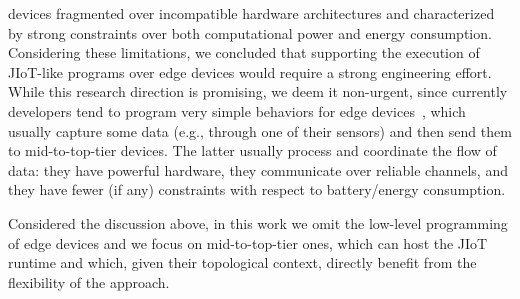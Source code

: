 devices fragmented over incompatible hardware architectures and characterized by
strong constraints over both computational power and energy consumption.
Considering these limitations, we concluded that supporting the execution of
JIoT-like programs over edge devices would require a strong engineering effort.
While this research direction is promising, we deem it non-urgent, since
currently developers tend to program very simple behaviors for edge
devices~\cite{7123563}, which usually capture some data (e.g., through one of
their sensors) and then send them to mid-to-top-tier devices. The latter usually
process and coordinate the flow of data: they have powerful hardware, they
communicate over reliable channels, and they have fewer (if any) constraints
with respect to battery/energy consumption.

Considered the discussion above, in this work we omit the low-level programming
of edge devices and we focus on mid-to-top-tier ones, which can host the JIoT
runtime and which, given their topological context, directly benefit from the
flexibility of the approach.
